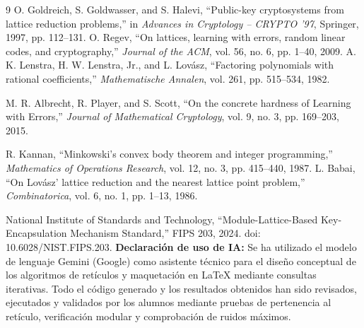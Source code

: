 \documentclass[12pt,a4paper]{article}
\begin{document}
\begin{thebibliography}{9}
\footnotesize
{} O. Goldreich, S. Goldwasser, and S. Halevi, ``Public-key cryptosystems from lattice reduction problems,'' in \textit{Advances in Cryptology -- CRYPTO '97}, Springer, 1997, pp. 112--131.
 O. Regev, ``On lattices, learning with errors, random linear codes, and cryptography,'' \textit{Journal of the ACM}, vol. 56, no. 6, pp. 1--40, 2009.
A. K. Lenstra, H. W. Lenstra, Jr., and L. Lovász,
``Factoring polynomials with rational coefficients,''
\textit{Mathematische Annalen},
vol. 261, pp. 515--534, 1982.

M. R. Albrecht, R. Player, and S. Scott,
``On the concrete hardness of Learning with Errors,''
\textit{Journal of Mathematical Cryptology},
vol. 9, no. 3, pp. 169--203, 2015.

R. Kannan,
``Minkowski's convex body theorem and integer programming,''
\textit{Mathematics of Operations Research},
vol. 12, no. 3, pp. 415--440, 1987.
L. Babai,
``On Lovász' lattice reduction and the nearest
lattice point problem,''
\textit{Combinatorica},
vol. 6, no. 1, pp. 1--13, 1986.

National Institute of Standards and Technology,
``Module-Lattice-Based Key-Encapsulation
Mechanism Standard,''
FIPS 203, 2024.
doi: 10.6028/NIST.FIPS.203.
 \textbf{Declaración de uso de IA:} Se ha utilizado el modelo de lenguaje Gemini (Google) como asistente técnico para el diseño conceptual de los algoritmos de retículos
y maquetación en LaTeX mediante consultas iterativas. Todo el código generado y los resultados
obtenidos han sido revisados, ejecutados y validados por los alumnos mediante pruebas de
pertenencia al retículo, verificación modular y comprobación de ruidos máximos.

\end{thebibliography}
\end{document}
